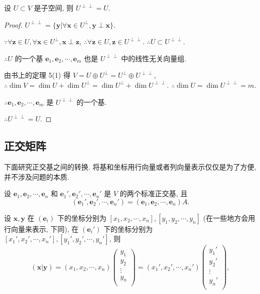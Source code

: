 \documentclass{ctexart}
\begin{document}
\begin{theorem}[书上的定理 5(2)]
    设 $U\subset V$ 是子空间, 则 $U^{\perp\perp}=U$.
\end{theorem}
\begin{proof}
    $U^{\perp\perp}=\{\boldsymbol{y}|\forall\boldsymbol{x}\in U^\perp,\boldsymbol{y}\perp\boldsymbol{x}\}$.
    
    $\because\forall\boldsymbol{z}\in U,\forall\boldsymbol{x}\in U^\perp,\boldsymbol{x}\perp\boldsymbol{z}$, $\therefore\forall\boldsymbol{z}\in U,\boldsymbol{z}\in U^{\perp\perp}$. $\therefore U\subset U^{\perp\perp}$.

    $\therefore U$ 的一个基 $\boldsymbol{e}_1,\boldsymbol{e}_2,\cdots,\boldsymbol{e}_m$ 也是 $U^{\perp\perp}$ 中的线性无关向量组.

    由书上的定理 5(1) 得 $V=U\oplus U^\perp=U^\perp\oplus U^{\perp\perp}$, $\therefore\dim V=\dim U+\dim U^\perp=\dim U^\perp+\dim U^{\perp\perp}$. $\therefore\dim U=\dim U^{\perp\perp}=m$.

    $\therefore\boldsymbol{e}_1,\boldsymbol{e}_2,\cdots,\boldsymbol{e}_m$ 是 $U^{\perp\perp}$ 的一个基.

    $\therefore U^{\perp\perp}=U$.
\end{proof}
\subsection{正交矩阵}
下面研究正交基之间的转换. 将基和坐标用行向量或者列向量表示仅仅是为了方便, 并不涉及问题的本质.

设 $\boldsymbol{e}_1,\boldsymbol{e}_2,\cdots,\boldsymbol{e}_n$ 和 $\boldsymbol{e}_1',\boldsymbol{e}_2',\cdots,\boldsymbol{e}_n'$ 是 $V$ 的两个标准正交基, 且
\[(\boldsymbol{e}_1',\boldsymbol{e}_2',\cdots,\boldsymbol{e}_n')=(\boldsymbol{e}_1,\boldsymbol{e}_2,\cdots,\boldsymbol{e}_n)A.\]

设 $\boldsymbol{x},\boldsymbol{y}$ 在 $(\boldsymbol{e}_i)$ 下的坐标分别为 $[x_1,x_2,\cdots,x_n],[y_1,y_2,\cdots,y_n]$ (在一些地方会用行向量来表示, 下同), 在 $(\boldsymbol{e}_i')$ 下的坐标分别为 $[x_1',x_2',\cdots,x_n'],[y_1',y_2',\cdots,y_n']$, 则
\[(\boldsymbol{x}|\boldsymbol{y})=(x_1,x_2,\cdots,x_n)\begin{pmatrix}
    y_1 \\
    y_2 \\
    \vdots \\
    y_n \\
\end{pmatrix}=(x_1',x_2',\cdots,x_n')\begin{pmatrix}
    y_1' \\
    y_2' \\
    \vdots \\
    y_n' \\
\end{pmatrix},\]
\end{document}
